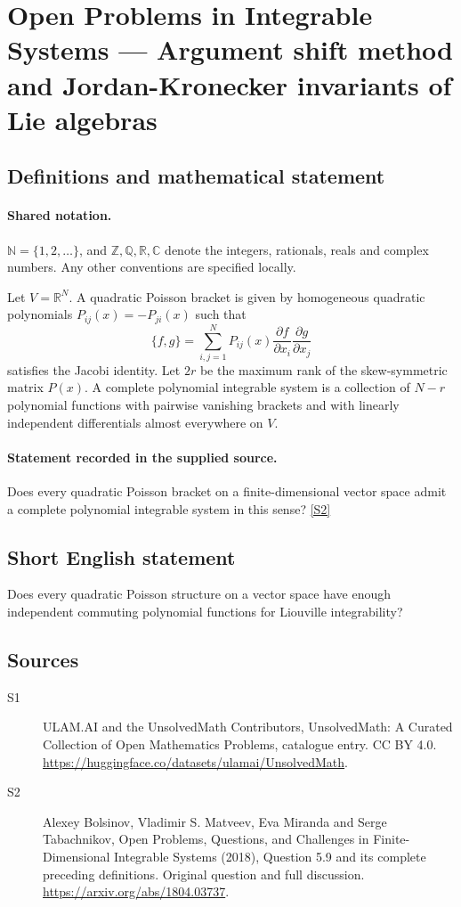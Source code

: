 \documentclass[11pt]{article}
\newcommand{\sref}[2]{\hyperlink{source:#1:#2}{[S#2]}}
\begin{document}
\section{Open Problems in Integrable Systems — Argument shift method and Jordan-Kronecker invariants of Lie algebras}\label{statement}

\subsection{Definitions and mathematical statement}

\paragraph{Shared notation.}$\mathbb N=\{1,2,\ldots\}$, and $\mathbb Z,\mathbb Q,\mathbb R,\mathbb C$ denote the integers, rationals, reals and complex numbers. Any other conventions are specified locally.


Let $V=\mathbb R^N$. A quadratic Poisson bracket is given by homogeneous quadratic polynomials $P_{ij}(x)=-P_{ji}(x)$ such that
\[\{f,g\}=\sum_{i,j=1}^N P_{ij}(x)\frac{\partial f}{\partial x_i}\frac{\partial g}{\partial x_j}\]
satisfies the Jacobi identity. Let $2r$ be the maximum rank of the skew-symmetric matrix $P(x)$. A complete polynomial integrable system is a collection of $N-r$ polynomial functions with pairwise vanishing brackets and with linearly independent differentials almost everywhere on $V$.
\paragraph{Statement recorded in the supplied source.}
Does every quadratic Poisson bracket on a finite-dimensional vector space admit a complete polynomial integrable system in this sense? \sref{statement}{2}
\subsection{Short English statement}
Does every quadratic Poisson structure on a vector space have enough independent commuting polynomial functions for Liouville integrability?
\subsection{Sources}
\begin{description}
\item[\hypertarget{source:statement:1}{S1}] ULAM.AI and the UnsolvedMath Contributors, UnsolvedMath: A Curated Collection of Open Mathematics Problems, catalogue entry. CC BY 4.0. \url{https://huggingface.co/datasets/ulamai/UnsolvedMath}.
\item[\hypertarget{source:statement:2}{S2}] Alexey Bolsinov, Vladimir S. Matveev, Eva Miranda and Serge Tabachnikov, Open Problems, Questions, and Challenges in Finite-Dimensional Integrable Systems (2018), Question 5.9 and its complete preceding definitions. Original question and full discussion. \url{https://arxiv.org/abs/1804.03737}.

\end{description}
\label{end:statement}
\end{document}
